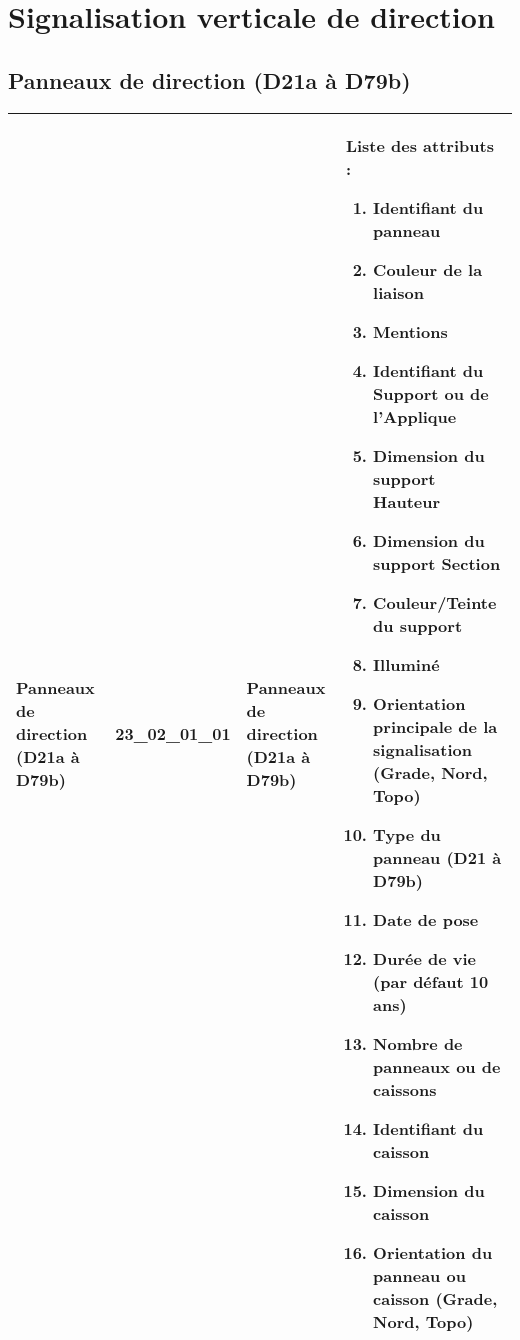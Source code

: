 \documentclass[12pt,titlepage]{book}
\begin{document}
\section{\large Signalisation verticale de direction}
\subsection{Panneaux de direction (D21a à D79b)}
\noindent
\vspace{\baselineskip}

\renewcommand{\arraystretch}{1.2}
\begin{supertabular}{|p{10cm}|c|p{13cm}|p{12cm}|}
 Panneaux de direction (D21a à D79b) & 23\_02\_01\_01 & Panneaux de direction (D21a à D79b) & Liste des attributs :
\begin{enumerate}
  \item Identifiant du panneau  \item Couleur de la liaison  \item Mentions  \item Identifiant du Support ou de l'Applique  \item Dimension du support  Hauteur  \item Dimension du support Section  \item Couleur/Teinte du support  \item Illuminé  \item Orientation principale de la signalisation (Grade, Nord, Topo)  \item Type du panneau (D21 à D79b)  \item Date de pose  \item Durée de vie (par défaut 10 ans)  \item Nombre de panneaux ou de caissons  \item Identifiant du caisson  \item Dimension du caisson  \item Orientation du panneau ou caisson (Grade, Nord, Topo)\end{enumerate}
\\
\hline
\end{supertabular}
\end{document}
